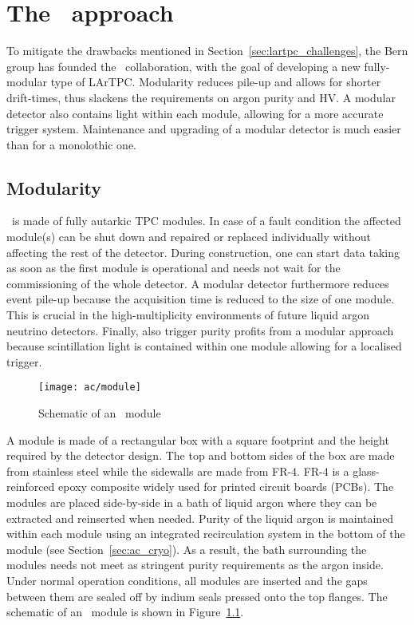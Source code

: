 \chapter{The \AC\ approach\label{chap:argoncube}}
To mitigate the drawbacks mentioned in Section~\ref{sec:lartpc_challenges}, the Bern group has founded the \AC\ collaboration, with the goal of developing a new fully-modular type of LArTPC.
Modularity reduces pile-up and allows for shorter drift-times, thus slackens the requirements on argon purity and HV.
A modular detector also contains light within each module, allowing for a more accurate trigger system.
Maintenance and upgrading of a modular detector is much easier than for a monolothic one.


\section{Modularity\label{sec:ac_modularity}}
\AC\ is made of fully autarkic TPC modules.
In case of a fault condition the affected module(s) can be shut down and repaired or replaced individually without affecting the rest of the detector.
During construction, one can start data taking as soon as the first module is operational and needs not wait for the commissioning of the whole detector.
A modular detector furthermore reduces event pile-up because the acquisition time is reduced to the size of one module.
This is crucial in the high-multiplicity environments of future liquid argon neutrino detectors.
Finally, also trigger purity profits from a modular approach because scintillation light is contained within one module allowing for a localised trigger.

\begin{figure}[htb] %
	\centering
	\texttt{[image: ac/module]}
	\caption{Schematic of an \AC\ module}
	\label{fig:ac_module}
\end{figure}

A module is made of a rectangular box with a square footprint and the height required by the detector design.
The top and bottom sides of the box are made from stainless steel while the sidewalls are made from FR-4.
FR-4 is a glass-reinforced epoxy composite widely used for printed circuit boards (PCBs).
The modules are placed side-by-side in a bath of liquid argon where they can be extracted and reinserted when needed.
Purity of the liquid argon is maintained within each module using an integrated recirculation system in the bottom of the module (see Section~\ref{sec:ac_cryo}).
As a result, the bath surrounding the modules needs not meet as stringent purity requirements as the argon inside.
Under normal operation conditions, all modules are inserted and the gaps between them are sealed off by indium seals pressed onto the top flanges.
The schematic of an \AC\ module is shown in Figure~\ref{fig:ac_module}.

